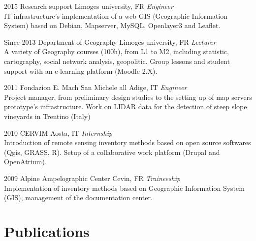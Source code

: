 \documentclass[]{cv-etienne}
\begin{document}
\begin{entrylist}
\entry
{2015}
{Research support}
{Limoges university, FR}
{\emph{Engineer} \\
IT infrastructure's implementation of a web-GIS (Geographic Information System) based on Debian, Mapserver, MySQL, Openlayer3 and Leaflet.
}
\end{entrylist}

\begin{entrylist}
\entry
{Since 2013}
{Department of Geography}
{Limoges university, FR}
{\emph{Lecturer} \\
A variety of Geography courses (100h), from L1 to M2, including statistic, cartography, social network analysis, geopolitic. Group lessons and student support with an e-learning platform (Moodle 2.X).
}
\end{entrylist}
\begin{entrylist}
\entry
{2011}
{Fondazion E. Mach}
{San Michele all Adige, IT}
{\emph{Engineer}\\
Project manager, from preliminary design studies to the setting up of map servers prototype's infrastructure. Work on LIDAR data for the detection of steep slope vineyards in Trentino (Italy)
}
\end{entrylist}
\begin{entrylist}
\entry
{2010}
{CERVIM}
{Aosta, IT}
{\emph{Internship}\\
Introduction of remote sensing inventory methods based on open source softwares (Qgis, GRASS, R). Setup of a collaborative work platform (Drupal and OpenAtrium).
}
\end{entrylist}
\begin{entrylist}
\entry
{2009}
{Alpine Ampelographic Center}
{Cevin, FR}
{\emph{Traineeship}\\
Implementation of inventory methods based on Geographic Information System (GIS), management of the documentation center.
}
\end{entrylist}
\section{Publications}
\begin{refsection}
  \nocite{*}
  \printbibliography[type=article,title={Article in peer-reviewed journals},heading=subbibliography,sorting=ynt]
  \nocite{*}
  \printbibliography[type=incollection,title={Book chapters},heading=subbibliography,sorting=ynt]
  \nocite{*}
  \printbibliography[type=inproceedings,title={Peer-reviewed conferences},heading=subbibliography,sorting=ynt]
\end{refsection}
\end{document}
